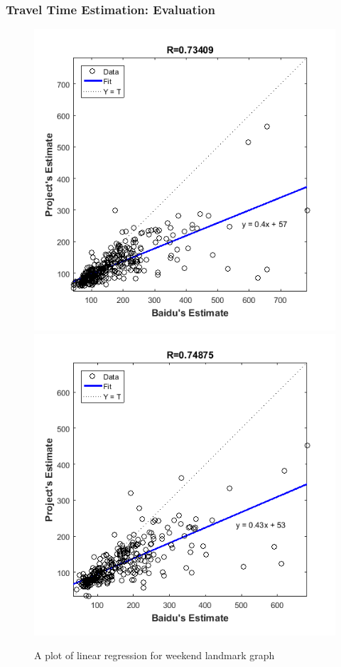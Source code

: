 \documentclass{beamer}
\theoremstyle{definition}
\begin{document}
\begin{frame}
\frametitle{Travel Time Estimation: Evaluation}

\begin{figure}[h!]
\centering
\includegraphics[scale = 0.4]{holi_50m_reg}
\includegraphics[scale = 0.4]{holi_30m_reg}
\caption{A plot of linear regression for weekend landmark graph}
\label{Fig:holi_reg}
\end{figure}
\end{frame}
\end{document}

